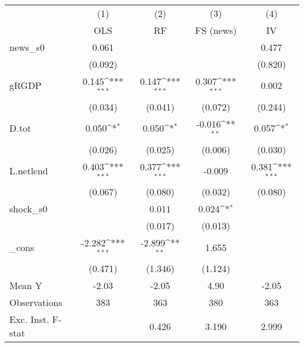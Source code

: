 {
\def\sym#1{\ifmmode^{#1}\else\(^{#1}\)\fi}
\begin{tabular}{l*{4}{c}}
\toprule
            &\multicolumn{1}{c}{(1)}&\multicolumn{1}{c}{(2)}&\multicolumn{1}{c}{(3)}&\multicolumn{1}{c}{(4)}\\
            &\multicolumn{1}{c}{OLS}&\multicolumn{1}{c}{RF}&\multicolumn{1}{c}{FS (news)}&\multicolumn{1}{c}{IV}\\
\midrule
news\_s0     &       0.061         &                     &                     &       0.477         \\
            &     (0.092)         &                     &                     &     (0.820)         \\
\addlinespace
gRGDP       &       0.145\sym{***}&       0.147\sym{***}&       0.307\sym{***}&       0.002         \\
            &     (0.034)         &     (0.041)         &     (0.072)         &     (0.244)         \\
\addlinespace
D.tot       &       0.050\sym{*}  &       0.050\sym{*}  &      -0.016\sym{**} &       0.057\sym{*}  \\
            &     (0.026)         &     (0.025)         &     (0.006)         &     (0.030)         \\
\addlinespace
L.netlend   &       0.403\sym{***}&       0.377\sym{***}&      -0.009         &       0.381\sym{***}\\
            &     (0.067)         &     (0.080)         &     (0.032)         &     (0.080)         \\
\addlinespace
shock\_s0    &                     &       0.011         &       0.024\sym{*}  &                     \\
            &                     &     (0.017)         &     (0.013)         &                     \\
\addlinespace
\_cons      &      -2.282\sym{***}&      -2.899\sym{**} &       1.655         &                     \\
            &     (0.471)         &     (1.346)         &     (1.124)         &                     \\
\midrule
Mean Y      &       -2.03         &       -2.05         &        4.90         &       -2.05         \\
Observations&         383         &         363         &         380         &         363         \\
Exc. Inst. F-stat&                     &       0.426         &       3.190         &       2.999         \\
\bottomrule
\end{tabular}
}

